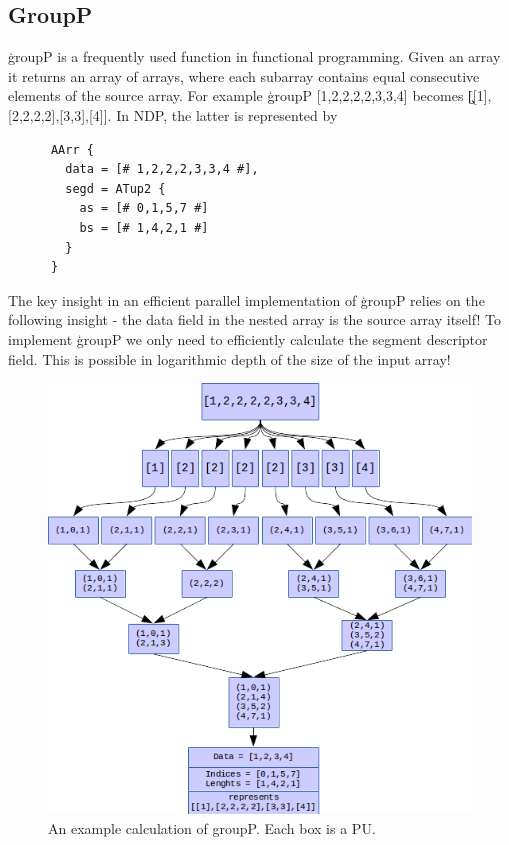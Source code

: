     \subsection{GroupP}
      \c{groupP} is a frequently used function in functional programming.
      Given an array it returns an array of arrays,
      where each subarray contains equal consecutive
      elements of the source array. For example
      \c{groupP [1,2,2,2,2,3,3,4]} becomes \c{[[1],[2,2,2,2],[3,3],[4]]}.
      In NDP, the latter is represented by
      \begin{lstlisting}
      AArr {
        data = [# 1,2,2,2,3,3,4 #],
        segd = ATup2 {
          as = [# 0,1,5,7 #]
          bs = [# 1,4,2,1 #]
        }
      }
      \end{lstlisting}
      The key insight in an efficient parallel implementation of \c{groupP}
      relies on the following insight - the data field in the nested array
      is the source array itself! To implement \c{groupP} we only
      need to efficiently calculate the segment descriptor field. This is
      possible in logarithmic depth of the size of the input array!
      
      \begin{figure}[h!]
          \includegraphics[width=\linewidth]{groupP.png}
          \caption{An example calculation of groupP. Each box is a PU.}
          \label{figure:groupP}
      \end{figure}
      
